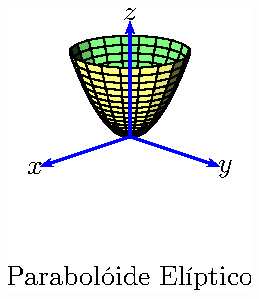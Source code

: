 \begin{ex}
\begin{figure}[htp]
\begin{minipage}{5cm}
\end{minipage}\begin{minipage}{5cm}
\includegraphics{cap_superficies/figs/figura_4}
\end{minipage}


\end{figure}
\end{ex}
